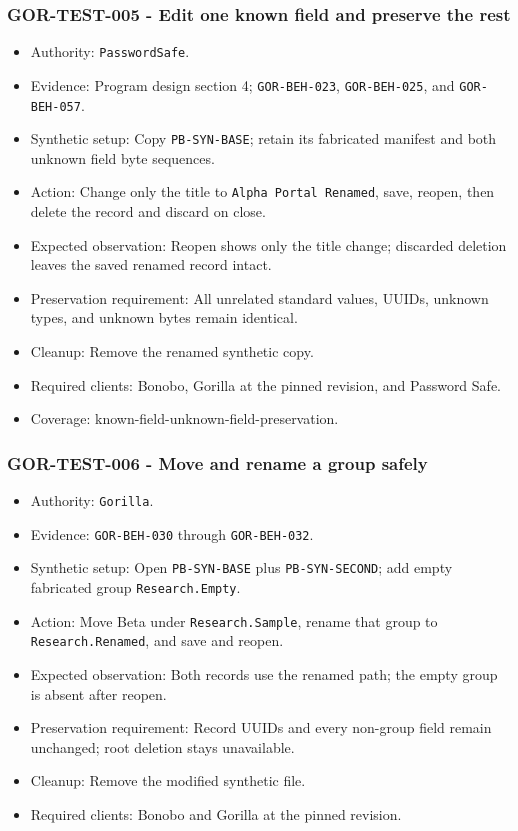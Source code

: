 \documentclass[
  letterpaper,
]{article}
\newcommand{\passthrough}[1]{#1}
\providecommand{\tightlist}{%
  \setlength{\itemsep}{0pt}\setlength{\parskip}{0pt}}
\begin{document}
\subsubsection{GOR-TEST-005 - Edit one known field and preserve the
rest}\label{gor-test-005---edit-one-known-field-and-preserve-the-rest}

\begin{itemize}
\tightlist
\item
  Authority: \nolinkurl{PasswordSafe}.
\item
  Evidence: Program design section 4; \nolinkurl{GOR-BEH-023}, \nolinkurl{GOR-BEH-025}, and \nolinkurl{GOR-BEH-057}.
\item
  Synthetic setup: Copy \nolinkurl{PB-SYN-BASE}; retain its fabricated manifest and both unknown field byte sequences.
\item
  Action: Change only the title to \passthrough{\lstinline!Alpha Portal Renamed!}, save, reopen, then delete the record
  and discard on close.
\item
  Expected observation: Reopen shows only the title change; discarded deletion leaves the saved renamed record intact.
\item
  Preservation requirement: All unrelated standard values, UUIDs, unknown types, and unknown bytes remain identical.
\item
  Cleanup: Remove the renamed synthetic copy.
\item
  Required clients: Bonobo, Gorilla at the pinned revision, and Password Safe.
\item
  Coverage: known-field-unknown-field-preservation.
\end{itemize}

\subsubsection{GOR-TEST-006 - Move and rename a group safely}\label{gor-test-006---move-and-rename-a-group-safely}

\begin{itemize}
\tightlist
\item
  Authority: \passthrough{\lstinline!Gorilla!}.
\item
  Evidence: \nolinkurl{GOR-BEH-030} through \nolinkurl{GOR-BEH-032}.
\item
  Synthetic setup: Open \nolinkurl{PB-SYN-BASE} plus \nolinkurl{PB-SYN-SECOND}; add empty fabricated group
  \nolinkurl{Research.Empty}.
\item
  Action: Move Beta under \nolinkurl{Research.Sample}, rename that group to \nolinkurl{Research.Renamed}, and save and
  reopen.
\item
  Expected observation: Both records use the renamed path; the empty group is absent after reopen.
\item
  Preservation requirement: Record UUIDs and every non-group field remain unchanged; root deletion stays unavailable.
\item
  Cleanup: Remove the modified synthetic file.
\item
  Required clients: Bonobo and Gorilla at the pinned revision.
\end{itemize}
\end{document}
